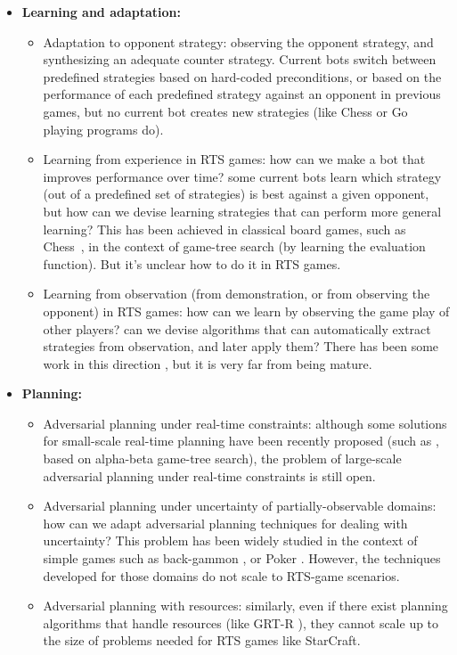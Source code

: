 \documentclass[journal]{IEEEtran}
\begin{document}
\begin{itemize}

\item {\bf Learning and adaptation:}
\begin{itemize}
\item Adaptation to opponent strategy: observing the opponent strategy, and synthesizing an adequate counter strategy. Current bots switch between predefined strategies based on hard-coded preconditions, or based on the performance of each predefined strategy against an opponent in previous games, but no current bot creates new strategies (like Chess or Go playing programs do).
\item Learning from experience in RTS games: how can we make a bot that improves performance over time? some current bots learn which strategy (out of a predefined set of strategies) is best against a given opponent, but how can we devise learning strategies that can perform more general learning? This has been achieved in classical board games, such as Chess~\cite{tesauro2001comparison}, in the context of game-tree search (by learning the evaluation function). But it's unclear how to do it in RTS games.
\item Learning from observation (from demonstration, or from observing the opponent) in RTS games: how can we learn by observing the game play of other players? can we devise algorithms that can automatically extract strategies from observation, and later apply them? There has been some work in this direction \cite{OntanonMSR10}, but it is very far from being mature.
\end{itemize}

\item {\bf Planning:}
\begin{itemize}
\item Adversarial planning under real-time constraints: although some solutions for small-scale real-time planning have been recently proposed (such as \cite{churchill2012AIIDE}, based on alpha-beta game-tree search), the problem of large-scale adversarial planning under real-time constraints is still open.
\item Adversarial planning under uncertainty of partially-observable domains: how can we adapt adversarial planning techniques for dealing with uncertainty? This problem has been widely studied in the context of simple games such as back-gammon \cite{tesauro1994td}, or Poker \cite{rubin2011computer}. However, the techniques developed for those domains do not scale to RTS-game scenarios.
\item Adversarial planning with resources: similarly, even if there exist planning algorithms that handle resources (like GRT-R \cite{refanidis2000heuristic}), they cannot scale up to the size of problems needed for RTS games like StarCraft.
\end{itemize}


\end{itemize}
\end{document}
